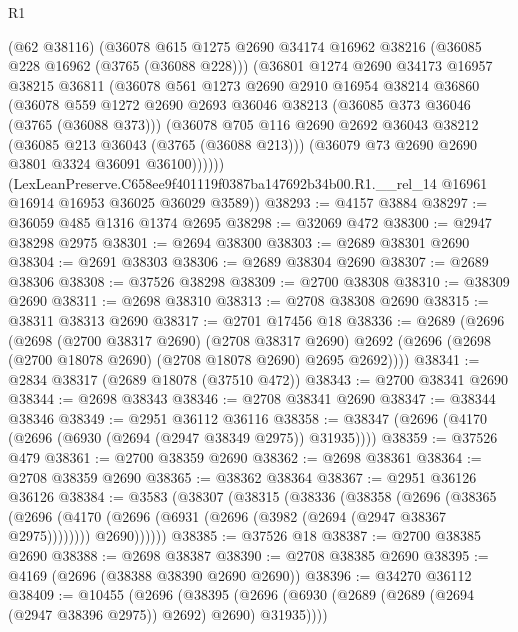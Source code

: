 \begin{lexlean}{R1}
\begin{coremodule}
      (@62 @38116)
      (@36078
        @615
        @1275
        @2690
        @34174
        @16962
        @38216
        (@36085 @228 @16962 (@3765 (@36088 @228)))
        (@36801
          @1274
          @2690
          @34173
          @16957
          @38215
          @36811
          (@36078
            @561
            @1273
            @2690
            @2910
            @16954
            @38214
            @36860
            (@36078
              @559
              @1272
              @2690
              @2693
              @36046
              @38213
              (@36085 @373 @36046 (@3765 (@36088 @373)))
              (@36078
                @705
                @116
                @2690
                @2692
                @36043
                @38212
                (@36085 @213 @36043 (@3765 (@36088 @213)))
                (@36079 @73 @2690 @2690 @3801 @3324 @36091 @36100))))))
      (LexLeanPreserve.C658ee9f401119f0387ba147692b34b00.R1.__rel_14
        @16961
        @16914
        @16953
        @36025
        @36029
        @3589))
@38293 := @4157 @3884
@38297 := @36059 @485 @1316 @1374 @2695
@38298 := @32069 @472
@38300 := @2947 @38298 @2975
@38301 := @2694 @38300
@38303 := @2689 @38301 @2690
@38304 := @2691 @38303
@38306 := @2689 @38304 @2690
@38307 := @2689 @38306
@38308 := @37526 @38298
@38309 := @2700 @38308
@38310 := @38309 @2690
@38311 := @2698 @38310
@38313 := @2708 @38308 @2690
@38315 := @38311 @38313 @2690
@38317 := @2701 @17456 @18
@38336 := @2689
    (@2696
      (@2698
        (@2700 @38317 @2690)
        (@2708 @38317 @2690)
        @2692
        (@2696 (@2698 (@2700 @18078 @2690) (@2708 @18078 @2690) @2695 @2692))))
@38341 := @2834 @38317 (@2689 @18078 (@37510 @472))
@38343 := @2700 @38341 @2690
@38344 := @2698 @38343
@38346 := @2708 @38341 @2690
@38347 := @38344 @38346
@38349 := @2951 @36112 @36116
@38358 := @38347 (@2696 (@4170 (@2696 (@6930 (@2694 (@2947 @38349 @2975)) @31935))))
@38359 := @37526 @479
@38361 := @2700 @38359 @2690
@38362 := @2698 @38361
@38364 := @2708 @38359 @2690
@38365 := @38362 @38364
@38367 := @2951 @36126 @36126
@38384 := @3583
    (@38307
      (@38315
        (@38336
          (@38358
            (@2696
              (@38365
                (@2696 (@4170 (@2696 (@6931 (@2696 (@3982 (@2694 (@2947 @38367 @2975))))))))
                @2690))))))
@38385 := @37526 @18
@38387 := @2700 @38385 @2690
@38388 := @2698 @38387
@38390 := @2708 @38385 @2690
@38395 := @4169 (@2696 (@38388 @38390 @2690 @2690))
@38396 := @34270 @36112
@38409 := @10455
    (@2696 (@38395 (@2696 (@6930 (@2689 (@2689 (@2694 (@2947 @38396 @2975)) @2692) @2690) @31935))))

\end{coremodule}
\end{lexlean}
